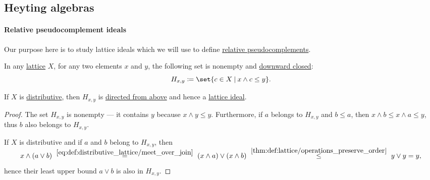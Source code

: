 \subsection{Heyting algebras}\label{subsec:heyting_algebras}

\paragraph{Relative pseudocomplement ideals}\hfill

Our purpose here is to study lattice ideals which we will use to define \hyperref[def:heyting_algebra]{relative pseudocomplements}.

\begin{proposition}\label{thm:relative_pseudocomplement_set_is_ideal}
  In any \hyperref[def:lattice]{lattice} \( X \), for any two elements \( x \) and \( y \), the following set is nonempty and \hyperref[def:closed_ordered_subset]{downward closed}:
  \begin{equation*}
    H_{x,y} \coloneqq \set{ c \in X \given x \wedge c \leq y }.
  \end{equation*}

  If \( X \) is \hyperref[def:distributive_lattice]{distributive}, then \( H_{x,y} \) is \hyperref[def:directed_set]{directed from above} and hence a \hyperref[def:lattice_ideal]{lattice ideal}.
\end{proposition}
\begin{proof}
  The set \( H_{x,y} \) is nonempty --- it contains \( y \) because \( x \wedge y \leq y \). Furthermore, if \( a \) belongs to \( H_{x,y} \) and \( b \leq a \), then \( x \wedge b \leq x \wedge a \leq y \), thus \( b \) also belongs to \( H_{x,y} \).

  If \( X \) is distributive and if \( a \) and \( b \) belong to \( H_{x,y} \), then
  \begin{equation*}
    x \wedge (a \vee b)
    \reloset {\eqref{eq:def:distributive_lattice/meet_over_join}} =
    (x \wedge a) \vee (x \wedge b)
    \reloset {\ref{thm:def:lattice/operations_preserve_order}} \leq
    y \vee y
    =
    y,
  \end{equation*}
  hence their least upper bound \( a \vee b \) is also in \( H_{x,y} \).
\end{proof}

